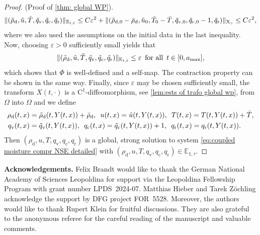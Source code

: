 \documentclass[10pt]{amsart}
\theoremstyle{plain}
\theoremstyle{definition}
\theoremstyle{thm}
\numberwithin{equation}{section}
\newcommand{\rC}{\mathrm{C}}
\newcommand{\rX}{\mathrm{X}}
\newcommand{\E}{\mathbb{E}}
\newcommand{\eps}{\varepsilon}
\newcommand{\rd}{\mathrm{d}}
\newcommand{\rr}{\mathrm{r}}
\newcommand{\rv}{\mathrm{v}}
\newcommand{\rc}{\mathrm{c}}
\newcommand{\trho}{\Tilde{\rho}}
\newcommand{\tu}{\Tilde{u}}
\newcommand{\tT}{\Tilde{T}}
\newcommand{\tq}{\Tilde{q}}
\begin{document}
\begin{proof}{(Proof of \autoref{thm: global WP}).}
\begin{equation*}
    \begin{aligned}
        \| (\trho_\rd,\tu,\tT,\tq_\rv,\tq_\rc,\tq_\rr) \|_{\E_{1,t}}
        \leq C \eps^2 + \| ( \trho_{\rd,0}- \bar{\rho}_\rd, \tu_0, \tT_0 - \bar{T}, \tq_{\rv,0}, \tq_{\rc,0}-1, \tq_\rr ) \|_{\rX_\gamma} \leq C\eps^2,
    \end{aligned}
\end{equation*}
where we also used the assumptions on the initial data in the last inequality. 
Now, choosing $\eps>0$ sufficiently small yields that 
\begin{equation*}
    \| (\trho_\rd,\tu,\tT,\tq_\rv,\tq_\rc,\tq_\rr) \|_{\E_{1,t}} \leq \eps \enspace \text{for all} \enspace t \in[0,a_{\mathrm{max}}],
\end{equation*}
which shows that $\Phi$ is well-defined and a self-map. The contraction property can be shown in the same way. 
Finally, since $\eps$ may be chosen sufficiently small, the transform $X(t,\cdot)$ is a $\rC^1$-diffeomorphism, see \autoref{lem:ests of trafo global wp}, from $\Omega$ into $\Omega$ and we define 
\begin{equation*}
    \begin{aligned}
        \rho_\rd(t,x)
        &= \trho_\rd(t,Y(t,x))+ \bar{\rho}_\rd, \enspace u(t,x) = \tu(t,Y(t,x)), \enspace T(t,x) =T(t,Y(t,x)) + \bar{T} ,\\
        q_\rv(t,x) &= \tq_\rv(t,Y(t,x)), \enspace q_\rc(t,x) = \tq_\rc(t,Y(t,x)) +1 , \enspace q_\rr(t,x) = q_\rr(t,Y(t,x)).
    \end{aligned}
\end{equation*}
Then $(\rho_\rd,u,T,q_\rv, q_\rc,q_\rr)$ is a global, strong solution to system \eqref{eq:coupled moisture compr NSE detailed} with $(\rho_\rd,u,T,q_\rv, q_\rc,q_\rr)\in \E_{1,\tau}$.
\end{proof}


\medskip 

{\bf Acknowledgements.}
Felix Brandt would like to thank the German National Academy of Sciences Leopoldina for support via the Leopoldina Fellowship Program with grant number LPDS~2024-07.
Matthias Hieber and Tarek Z\"ochling acknowledge the support by DFG project FOR~5528.
Moreover, the authors would like to thank Rupert Klein for fruitful discussions.
They are also grateful to the anonymous referee for the careful reading of the manuscript and valuable comments.
\end{document}
